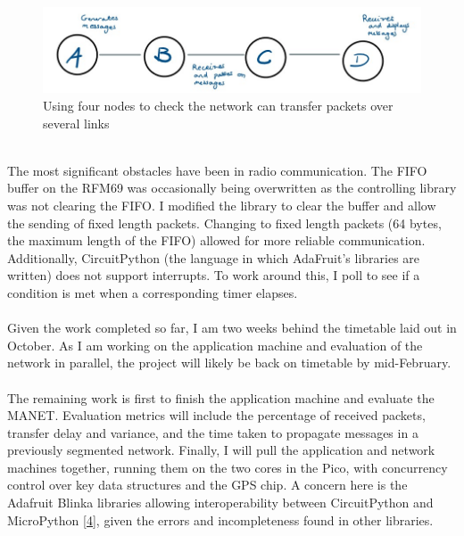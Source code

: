 \documentclass[10pt, a4paper]{article}
\begin{document}
\begin{figure}[h]
\caption{Using four nodes to check the network can transfer packets over several links}
\begin{center}
\includegraphics[scale=0.4]{test2.jpg}
\end{center}
\end{figure} \\
The most significant obstacles have been in radio communication. The FIFO buffer on the RFM69 was occasionally being overwritten as the controlling library was not clearing the FIFO. I modified the library to clear the buffer and allow the sending of fixed length packets. Changing to fixed length packets (64 bytes, the maximum length of the FIFO) allowed for more reliable communication. Additionally, CircuitPython (the language in which AdaFruit's libraries are written) does not support interrupts. To work around this, I poll to see if a condition is met when a corresponding timer elapses. \\ \\
Given the work completed so far, I am two weeks behind the timetable laid out in October. As I am working on the application machine and evaluation of the network in parallel, the project will likely be back on timetable by mid-February. \\ \\
The remaining work is first to finish the application machine and evaluate the MANET. Evaluation metrics will include the percentage of received packets, transfer delay and variance, and the time taken to propagate messages in a previously segmented network. Finally, I will pull the application and network machines together, running them on the two cores in the Pico, with concurrency control over key data structures and the GPS chip. A concern here is the Adafruit Blinka libraries allowing interoperability between CircuitPython and MicroPython \hyperref[blinka]{[4]}, given the errors and incompleteness found in other libraries. 
\end{document}
